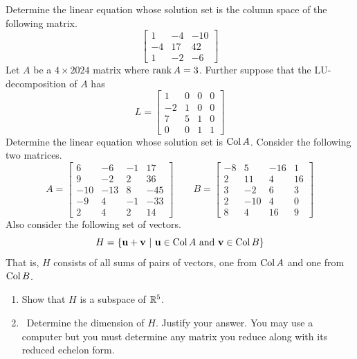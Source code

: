 \begin{tasks}[resume, style=enumerate]
\begin{enumerate}[label=(\alph*)]
  \end{enumerate}
\task
  Determine the linear equation whose solution set is the column space
  of the following matrix.
  \begin{displaymath}
    \begin{bmatrix}
      1 & -4 & -10 \\
      -4 & 17 & 42 \\
      1 & -2 & -6
    \end{bmatrix}
  \end{displaymath}
\task
  Let $A$ be a $4 \times 2024$ matrix where $\operatorname{\mathrm{rank}} A = 3$. Further
  suppose that the LU-decomposition of $A$ has
  \begin{displaymath}
    L =
    \begin{bmatrix}
      1 & 0 & 0 & 0 \\
      -2 & 1 & 0 & 0 \\
      7 & 5 & 1 & 0 \\
      0 & 0 & 1 & 1
    \end{bmatrix}
  \end{displaymath}
  Determine the linear equation whose solution set is $\operatorname{\mathrm{Col}} A$.
\task
  Consider the following two matrices.
  \begin{displaymath}
    A =
    \begin{bmatrix}
      6 & -6 & -1 & 17 \\
      9 & -2 & 2 & 36 \\
      -10 & -13 & 8 & -45 \\
      -9 & 4 & -1 & -33 \\
      2 & 4 & 2 & 14
    \end{bmatrix}
    \qquad
    B =
    \begin{bmatrix}
      -8 & 5 & -16 & 1 \\
      2 & 11 & 4 & 16 \\
      3 & -2 & 6 & 3 \\
      2 & -10 & 4 & 0 \\
      8 & 4 & 16 & 9
    \end{bmatrix}
  \end{displaymath}
  Also consider the following set of vectors.
  \begin{displaymath}
    H = \{ \mathbf u + \mathbf v \ | \ \mathbf u \in \operatorname{\mathrm{Col}} A \text{ and } \mathbf v \in \operatorname{\mathrm{Col}} B \}
  \end{displaymath}
  That is, $H$ consists of all sums of pairs of vectors, one from
  $\operatorname{\mathrm{Col}} A$ and one from $\operatorname{\mathrm{Col}} B$.
  \begin{enumerate}[label=(\alph*)]
  \item
    Show that $H$ is a subspace of $\mathbb R^5$.
  \item \faCalculator \
    Determine the dimension of $H$.  Justify your answer.  You may use a
    computer but you must determine any matrix you reduce along with its
    reduced echelon form.
  \end{enumerate}
\end{tasks}

